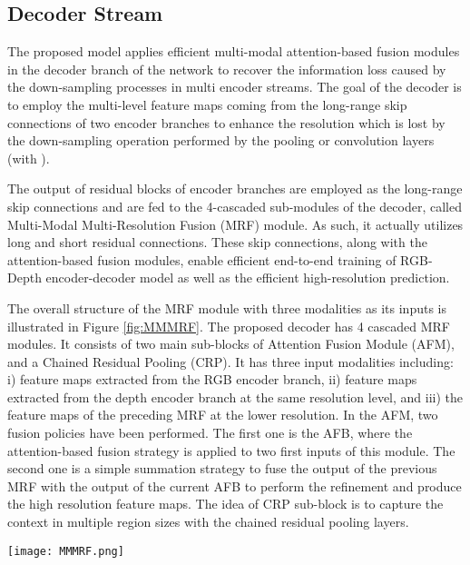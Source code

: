 \documentclass[journal,transmag]{IEEEtran}
\begin{document}
\subsection{Decoder Stream}
The proposed model applies efficient multi-modal attention-based fusion modules in the decoder branch of the network to recover the information loss caused by the down-sampling processes in multi encoder streams. The goal of the decoder is to employ the multi-level feature maps coming from the long-range skip connections of two encoder branches to enhance the resolution which is lost by the down-sampling operation performed by the pooling or convolution layers (with ).  

The output of residual blocks of encoder branches are employed as the long-range skip connections and are fed to the 4-cascaded sub-modules of the decoder, called Multi-Modal Multi-Resolution Fusion (MRF) module. As such, it actually utilizes long and short residual connections. These skip connections, along with the attention-based fusion modules, enable efficient end-to-end training of RGB-Depth encoder-decoder model as well as the efficient high-resolution prediction. 

The overall structure of the MRF module with three modalities as its inputs is illustrated in Figure \ref{fig:MMMRF}. The proposed decoder has 4 cascaded MRF modules. It consists of two main sub-blocks of Attention Fusion Module (AFM), and a Chained Residual Pooling (CRP). It has three input modalities including: i) feature maps extracted from the RGB encoder branch, ii) feature maps extracted from the depth encoder branch at the same resolution level, and iii) the feature maps of the preceding MRF at the lower resolution. In the AFM, two fusion policies have been performed. The first one is the AFB, where the attention-based fusion strategy is applied to two first inputs of this module.  The second one is a simple summation strategy to fuse the output of the previous MRF with the output of the current AFB to perform the refinement and produce the high resolution feature maps. The idea of CRP sub-block is to capture the context in multiple region sizes with the chained residual pooling layers. 
\begin{figure*}
	\begin{center}
		\texttt{[image: MMMRF.png]}
	\end{center}
	\caption{Proposed multi-modal multi-resolution fusion module.}
	\label{fig:MMMRF}
\end{figure*}
\end{document}
